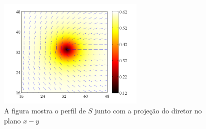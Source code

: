 \begin{figure}[!htb]
  \centering
		\includegraphics[width= 7.0cm]{fig/fig-1}
  \caption{A figura mostra o perfil de $S$ junto com a projeção do
diretor no plano $x-y$}
  \label{figura-1}
\end{figure}

\begin{figure}[!htb]
  \centering

\end{figure}
